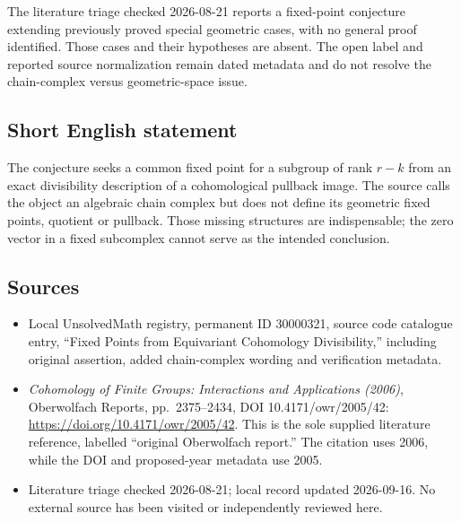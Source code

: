 \documentclass[11pt]{article}
\begin{document}
The literature triage checked 2026-08-21 reports a fixed-point conjecture extending previously proved special geometric cases, with no general proof identified. Those cases and their hypotheses are absent. The open label and reported source normalization remain dated metadata and do not resolve the chain-complex versus geometric-space issue.
\subsection{Short English statement}
The conjecture seeks a common fixed point for a subgroup of rank \(r-k\) from an exact divisibility description of a cohomological pullback image. The source calls the object an algebraic chain complex but does not define its geometric fixed points, quotient or pullback. Those missing structures are indispensable; the zero vector in a fixed subcomplex cannot serve as the intended conclusion.
\subsection{Sources}
\begin{itemize}
\item Local UnsolvedMath registry, permanent ID 30000321, source code catalogue entry, ``Fixed Points from Equivariant Cohomology Divisibility,'' including original assertion, added chain-complex wording and verification metadata.
\item \emph{Cohomology of Finite Groups: Interactions and Applications (2006)}, Oberwolfach Reports, pp.\ 2375--2434, DOI 10.4171/owr/2005/42: \url{https://doi.org/10.4171/owr/2005/42}. This is the sole supplied literature reference, labelled ``original Oberwolfach report.'' The citation uses 2006, while the DOI and proposed-year metadata use 2005.
\item Literature triage checked 2026-08-21; local record updated 2026-09-16. No external source has been visited or independently reviewed here.
\end{itemize}
\end{document}
